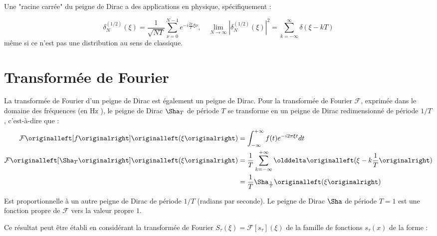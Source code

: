 Une "racine carr\'ee" du peigne de Dirac a des applications en physique, sp\'ecifiquement :

\[
    \delta_N^{(1 / 2)}(\xi) = \frac{1}{\sqrt{NT}} \sum_{\nu=0}^{N-1} e^{-i \frac{2\pi}{T}\xi \nu}, \quad 
\lim_{N \rightarrow \infty}\left|\delta_N^{(1 / 2)}(\xi)\right|^2= \sum_{k=-\infty}^{\infty} \delta(\xi - kT)
\]
m\^eme si ce n'est pas une distribution au sens de classique.

\section{Transformée de Fourier}

La transformée de Fourier d’un peigne de Dirac est également un peigne de Dirac. 
Pour la transformée de Fourier \(\mathcal{F}\), exprimée dans le domaine des 
fréquences (en \si{\hertz} ), le peigne de Dirac \(\Sha_T\) de période \(T\) se 
transforme en un peigne de Dirac redimensionné de période \(1/T\), c’est-à-dire que :
\begin{align*}
    \mathcal{F}\left[f\right]\left(\xi\right) &= \int_{-\infty}^{+\infty} f(t) e^{-i 2 \pi \xi t} dt\\
    \mathcal{F}\left[\Sha_T\right]\left(\xi\right) &= \frac{1}{T}\sum_{k=-\infty}^{+\infty} \delta\left(\xi - k\frac{1}{T}\right)\\
    &= \frac{1}{T}\Sha_\frac{1}{T}\left(\xi\right)
\end{align*}

Est proportionnelle à un autre peigne de Dirac de période \(1/T\) (radians par seconde).
Le peigne de Dirac \(\Sha\) de période \(T=1\) est une fonction propre de \(\mathcal{F}\) 
vers la valeur propre \(1\).

Ce résultat peut être établi en considérant la transformée de Fourier 
\(S_\tau\left(\xi\right)=\mathcal{F}\left[s_\tau\right]\left(\xi\right)\) de la famille
de fonctions \(s_\tau(x)\) de la forme :

